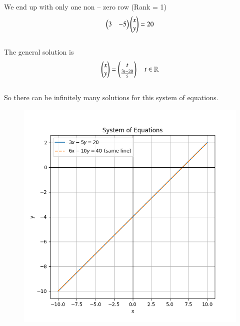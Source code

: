 \documentclass[journal]{IEEEtran}
\begin{document}
We end up with only one non -- zero row (Rank = 1)
\begin{align}
\begin{pmatrix}3 & -5\end{pmatrix}\begin{pmatrix}x \\ y\end{pmatrix} = 20
\end{align} \\ 


The general solution is 
\begin{align}
\begin{pmatrix}x \\ y\end{pmatrix} = \begin{pmatrix}t \\ \frac{3t-20}{5}\end{pmatrix} \quad t \in \mathbb{R}
\end{align}  \\

So there can be infinitely many solutions for this system of equations.


\begin{figure}[h!]
    \centering
    \includegraphics[height=0.5\textheight, keepaspectratio]{figs/Figure_1.png}
    \label{figure_1}
\end{figure}
\end{document}
